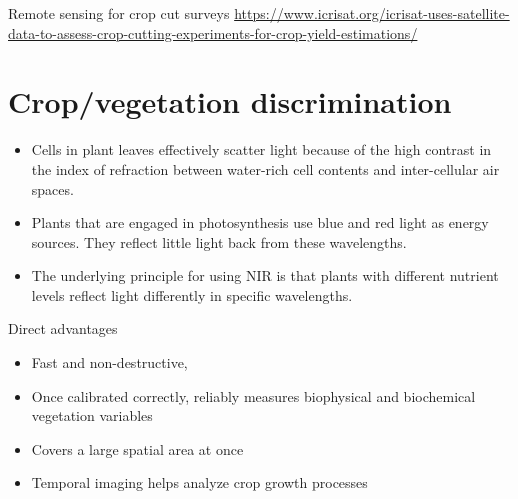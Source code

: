 \documentclass[11pt,dvipsnames,ignorenonframetext,aspectratio=169]{beamer}
\providecommand{\tightlist}{%
  \setlength{\itemsep}{0pt}\setlength{\parskip}{0pt}}
\begin{document}
\begin{frame}{Remote sensing for crop cut surveys}
\protect\hypertarget{remote-sensing-for-crop-cut-surveys}{}
\url{https://www.icrisat.org/icrisat-uses-satellite-data-to-assess-crop-cutting-experiments-for-crop-yield-estimations/}
\end{frame}

\hypertarget{cropvegetation-discrimination}{%
\section{Crop/vegetation
discrimination}\label{cropvegetation-discrimination}}

\begin{frame}{}
\protect\hypertarget{section-3}{}
\begin{itemize}
\tightlist
\item
  Cells in plant leaves effectively scatter light because of the high
  contrast in the index of refraction between water-rich cell contents
  and inter-cellular air spaces.
\item
  Plants that are engaged in photosynthesis use blue and red light as
  energy sources. They reflect little light back from these wavelengths.
\item
  The underlying principle for using NIR is that plants with different
  nutrient levels reflect light differently in specific wavelengths.
\end{itemize}
\end{frame}

\begin{frame}{Direct advantages}
\protect\hypertarget{direct-advantages}{}
\begin{itemize}
\tightlist
\item
  Fast and non-destructive,
\item
  Once calibrated correctly, reliably measures biophysical and
  biochemical vegetation variables
\item
  Covers a large spatial area at once
\item
  Temporal imaging helps analyze crop growth processes
\end{itemize}
\end{frame}
\end{document}
